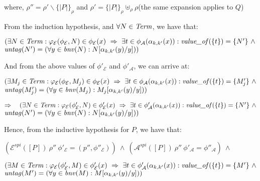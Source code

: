 \documentclass[10pt,a4paper,final,oneside,fleqn]{book}
\begin{document}
\noindent
where, $\rho''=\rho'\backslash\{\!|P|\!\}_\rho$ and $\rho'=\{\!|P|\!\}_\rho\uplus_\rho\rho$\hfill(the same expansion applies to $Q$)\vspace{5mm}

\noindent
From the induction hypothesis, and $\forall N\in\mbox{{\itshape Term\/}}$, we have that:

\noindent
$(\exists N\in\mbox{{\itshape Term\/}}:\varphi_\mathcal{E}(\phi_\mathcal{E},N)\in\phi_\mathcal{E}(x)~\Rightarrow~\exists t\in\phi_\mathcal{A}(\alpha_{k,k'}(x)):\mbox{{\itshape value\_of\/}}(\{t\})=\{N'\}~\wedge$\\
$\mbox{{\itshape untag\/}}(N')=(\forall y\in\mbox{{\itshape bnv\/}}(N):N[\alpha_{k,k'}(y)/y]))$\vspace{5mm}

\noindent
And from the above values of $\phi'_\mathcal{E}$ and $\phi'_\mathcal{A}$, we can arrive at:

\noindent
$(\exists M_j\in\mbox{{\itshape Term\/}}:\varphi_\mathcal{E}(\phi_\mathcal{E},M_j)\in\phi_\mathcal{E}(x)~\Rightarrow~\exists t\in\phi_\mathcal{A}(\alpha_{k,k'}(x)):\mbox{{\itshape value\_of\/}}(\{t\})=\{M'_j\}~\wedge$\\
$\mbox{{\itshape untag\/}}(M'_j)=(\forall y\in\mbox{{\itshape bnv\/}}(M_j):M_j[\alpha_{k,k'}(y)/y]))$\vspace{5mm}

\noindent
$\Rightarrow~~~(\exists N\in\mbox{{\itshape Term\/}}:\varphi_\mathcal{E}(\phi'_\mathcal{E},N)\in\phi'_\mathcal{E}(x)~\Rightarrow~\exists t\in\phi'_\mathcal{A}(\alpha_{k,k'}(x)): \mbox{{\itshape value\_of\/}}(\{t\})=\{N'\}~\wedge$\\
$\mbox{{\itshape untag\/}}(N')=(\forall y\in\mbox{{\itshape bnv\/}}(N):N[\alpha_{k,k'}(y)/y]))$\vspace{5mm}

\noindent
Hence, from the inductive hypothesis for $P$, we have that:

\noindent
$(\mathcal{E}^{spi}(\![P]\!)~\rho''~\phi'_{\mathcal{E}}=(p'',\phi''_\mathcal{E}))~\wedge~(\mathcal{A}^{spi}(\![P]\!)~\rho''~\phi'_{\mathcal{A}}=\phi''_\mathcal{A})~\wedge~$

\noindent
$(\exists M\in\mbox{{\itshape Term\/}}:\varphi_\mathcal{E}(\phi'_\mathcal{E},M)\in\phi'_\mathcal{E}(x)~\Rightarrow~\exists t\in\phi'_\mathcal{A}(\alpha_{k,k'}(x)):\mbox{{\itshape value\_of\/}}(\{t\})=\{M'\}~\wedge$\\
$\mbox{{\itshape untag\/}}(M')=(\forall y\in\mbox{{\itshape bnv\/}}(M):M[\alpha_{k,k'}(y)/y]))$\vspace{5mm}
\end{document}

